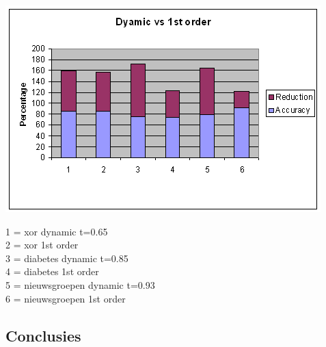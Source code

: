 \documentclass{article}
\begin{document}
\begin{center} \includegraphics[scale=0.7]{dynamic_vs_1storder} \end{center}
1 =	xor dynamic t=0.65\\
2 =	xor 1st order\\
3 =	diabetes dynamic t=0.85\\
4 =	diabetes 1st order\\
5 =	nieuwsgroepen dynamic t=0.93\\
6 =	nieuwsgroepen 1st order\\


\subsection{Conclusies}
\end{document}
